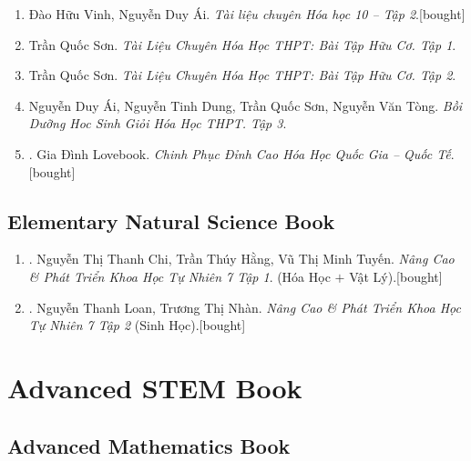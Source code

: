 \documentclass{article}
\begin{document}
\begin{enumerate}
	\item Đào Hữu Vinh, Nguyễn Duy Ái. \textit{Tài liệu chuyên Hóa học 10 -- Tập 2}.\hfill\textsf{[bought]}
	\item Trần Quốc Sơn. \textit{Tài Liệu Chuyên Hóa Học THPT: Bài Tập Hữu Cơ. Tập 1}.
	\item Trần Quốc Sơn. \textit{Tài Liệu Chuyên Hóa Học THPT: Bài Tập Hữu Cơ. Tập 2}.
	\item Nguyễn Duy Ái, Nguyễn Tinh Dung, Trần Quốc Sơn, Nguyễn Văn Tòng. \textit{Bồi Dưỡng Hoc Sinh Giỏi Hóa Học THPT. Tập 3}.
	\item \cite{Lovebook2022}. Gia Đình Lovebook. \textit{Chinh Phục Đỉnh Cao Hóa Học Quốc Gia -- Quốc Tế}.\hfill\textsf{[bought]}
\end{enumerate}

\subsection{Elementary Natural Science Book}

\begin{enumerate}
	\item \cite{Chi_Hang_Tuyen2022}. Nguyễn Thị Thanh Chi, Trần Thúy Hằng, Vũ Thị Minh Tuyến. \textit{Nâng Cao \& Phát Triển Khoa Học Tự Nhiên 7 Tập 1}. (Hóa Học $+$ Vật Lý).\hfill\textsf{[bought]}
	\item \cite{Loan_Nhan2022}. Nguyễn Thanh Loan, Trương Thị Nhàn. \textit{Nâng Cao \& Phát Triển Khoa Học Tự Nhiên 7 Tập 2} (Sinh Học).\hfill\textsf{[bought]}
\end{enumerate}


\section{Advanced STEM Book}

\subsection{Advanced Mathematics Book}
\end{document}
